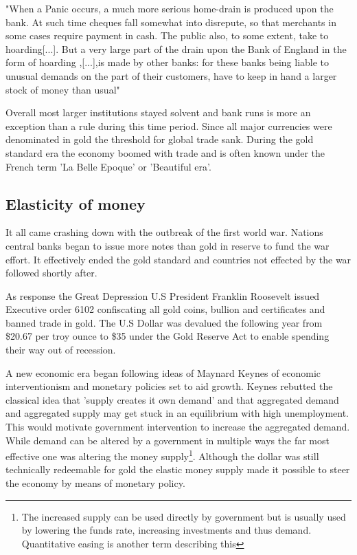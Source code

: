 \begin{displayquote}
	"When a Panic occurs, a much more serious home-drain is produced upon the bank. At such time cheques fall somewhat into disrepute, so that merchants in some cases require payment in cash. The public also, to some extent, take to hoarding[...]. But a very large part of the drain upon the Bank of England in the form of hoarding ,[...],is made by other banks: for these banks being liable to unusual demands on the part of their customers, have to keep in hand a larger stock of money than usual"\cite{patterson:monetary:drains}
\end{displayquote}

Overall most larger institutions stayed solvent and bank runs is more an exception than a rule during this time period. Since all major currencies were denominated in gold the threshold for global trade sank. During the gold standard era the economy boomed with trade and is often known under the French term 'La Belle Epoque' or 'Beautiful era'. 

\onecolumn

\subsection{Elasticity of money}

It all came crashing down with the outbreak of the first world war. Nations central banks began to issue more notes than gold in reserve to fund the war effort. It effectively ended the gold standard and countries not effected by the war followed shortly after.

As response the Great Depression U.S President Franklin Roosevelt issued Executive order 6102 confiscating all gold coins, bullion and certificates and banned trade in gold\cite{roosevelt:6102}. The U.S Dollar was devalued the following year from \$20.67 per troy ounce to \$35 under the Gold Reserve Act\cite{gold:reserve:act} to enable spending their way out of recession. 

A new economic era began following ideas of Maynard Keynes of economic interventionism and monetary policies set to aid growth. Keynes rebutted the classical idea that 'supply creates it own demand' and that aggregated demand and aggregated supply may get stuck in an equilibrium with high unemployment\cite{keynes:general:theory}. This would motivate government intervention to increase the aggregated demand. While demand can be altered by a government in multiple ways the far most effective one was altering the money supply\footnote{The increased supply can be used directly by government but is usually used by lowering the funds rate, increasing investments and thus demand. Quantitative easing is another term describing this }. Although the dollar was still technically redeemable for gold the elastic money supply made it possible to steer the economy by means of monetary policy. 

